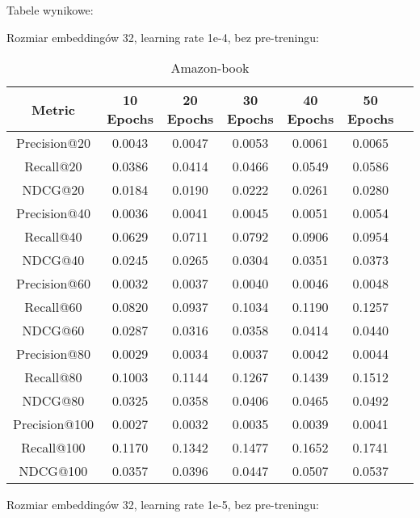 \documentclass[a4paper]{LTJournalArticle}
\begin{document}
	Tabele wynikowe:
	
	Rozmiar embeddingów 32, learning rate 1e-4, bez pre-treningu:
	\begin{table}[h]
		\centering
		\caption{Amazon-book}
		\label{tab:metrics_transposed}
		\scriptsize %
		\begin{tabular}{ccccccc}
			\toprule
			Metric & 10 Epochs & 20 Epochs & 30 Epochs & 40 Epochs & 50 Epochs \\
			\midrule
			Precision@20  & 0.0043  & 0.0047  & 0.0053  & 0.0061  & 0.0065  \\
			Recall@20     & 0.0386  & 0.0414  & 0.0466  & 0.0549  & 0.0586  \\
			NDCG@20       & 0.0184  & 0.0190  & 0.0222  & 0.0261  & 0.0280  \\
			Precision@40  & 0.0036  & 0.0041  & 0.0045  & 0.0051  & 0.0054  \\
			Recall@40     & 0.0629  & 0.0711  & 0.0792  & 0.0906  & 0.0954  \\
			NDCG@40       & 0.0245  & 0.0265  & 0.0304  & 0.0351  & 0.0373  \\
			Precision@60  & 0.0032  & 0.0037  & 0.0040  & 0.0046  & 0.0048  \\
			Recall@60     & 0.0820  & 0.0937  & 0.1034  & 0.1190  & 0.1257  \\
			NDCG@60       & 0.0287  & 0.0316  & 0.0358  & 0.0414  & 0.0440  \\
			Precision@80  & 0.0029  & 0.0034  & 0.0037  & 0.0042  & 0.0044  \\
			Recall@80     & 0.1003  & 0.1144  & 0.1267  & 0.1439  & 0.1512  \\
			NDCG@80       & 0.0325  & 0.0358  & 0.0406  & 0.0465  & 0.0492  \\
			Precision@100 & 0.0027  & 0.0032  & 0.0035  & 0.0039  & 0.0041  \\
			Recall@100    & 0.1170  & 0.1342  & 0.1477  & 0.1652  & 0.1741  \\
			NDCG@100      & 0.0357  & 0.0396  & 0.0447  & 0.0507  & 0.0537  \\
			\bottomrule
		\end{tabular}
	\end{table}
	Rozmiar embeddingów 32, learning rate 1e-5, bez pre-treningu:
\end{document}
